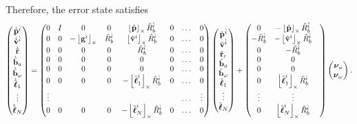 Therefore, the error state satisfies
\[
\begin{pmatrix} 
	\dot{\tilde{\mathbf{p}}}^{\hat{i}} \\ 
	\dot{\tilde{\mathbf{v}}}^{\hat{i}} \\ 
	\dot{\tilde{\mathbf{r}}} \\ 
	\dot{\tilde{\mathbf{b}}}_a \\ 
	\dot{\tilde{\mathbf{b}}}_\omega \\  
	\dot{\tilde{\boldsymbol{\ell}}}_1 \\ 
	\vdots \\ 
	\dot{\tilde{\boldsymbol{\ell}}}_N 
\end{pmatrix}
    = \begin{pmatrix} 0 & I & 0 & 0 & \left\lfloor\hat{\mathbf{p}}\right\rfloor_{\times}\hat{R}_b^{\hat{i}} & 0 & \dots & 0 \\ 
                      0 & 0 & -\left\lfloor\mathbf{g}^i\right\rfloor_{\times} & \hat{R}_b^{\hat{i}} & \left\lfloor\hat{\mathbf{v}}^i\right\rfloor_{\times} \hat{R}_b^{\hat{i}} & 0 & \dots & 0 \\ 
                      0 & 0 & 0 & 0 & \hat{R}_b^{\hat{i}} & 0 & \dots & 0 \\ 
                      0 & 0 & 0 & 0 & 0 & 0 & \dots & 0 \\
                      0 & 0 & 0 & 0 & 0 & 0 & \dots & 0 \\
                      0 & 0 & 0 & 0 & -\left\lfloor\hat{\boldsymbol{\ell}}_1^i\right\rfloor_{\times}\hat{R}_b^{\hat{i}} & 0 & \dots & 0 \\
                      \vdots &  &  & & &  & \dots & \vdots \\ 
                      0 & 0 & 0 & 0 & -\left\lfloor\hat{\boldsymbol{\ell}}_N^i\right\rfloor_{\times}\hat{R}_b^{\hat{i}} & 0 & \dots & 0 
      \end{pmatrix}
      \begin{pmatrix} 
      	\tilde{\mathbf{p}}^{\hat{i}} \\ 
      	\tilde{\mathbf{v}}^{\hat{i}} \\ 
      	\tilde{\mathbf{r}}_r \\ 
      	\tilde{\mathbf{b}}_a \\ 
      	\tilde{\mathbf{b}}_\omega \\ 
      	\tilde{\boldsymbol{\ell}}_1 \\ 
      	\vdots \\ 
      	\tilde{\boldsymbol{\ell}}_N 
      \end{pmatrix}
      + \begin{pmatrix} 0 & -\left\lfloor\hat{\mathbf{p}}\right\rfloor_{\times}\hat{R}_b^{\hat{i}}  \\ 
                      -\hat{R}_b^{\hat{i}} & -\left\lfloor\hat{\mathbf{v}}^i\right\rfloor_{\times} \hat{R}_b^{\hat{i}}  \\ 
                      0 & -\hat{R}_b^{\hat{i}} &  \\ 
                      0 & 0  \\
                      0 & 0  \\
                      0 & \left\lfloor\hat{\boldsymbol{\ell}}_1^i\right\rfloor_{\times}\hat{R}_b^{\hat{i}} \\
                      \vdots & \vdots \\ 
                      0 & \left\lfloor\hat{\boldsymbol{\ell}}_N^i\right\rfloor_{\times}\hat{R}_b^{\hat{i}} 
      \end{pmatrix}
      \begin{pmatrix} 
      	\boldsymbol{\nu}_a \\ 
      	\boldsymbol{\nu}_\omega 
      \end{pmatrix}.
\]
